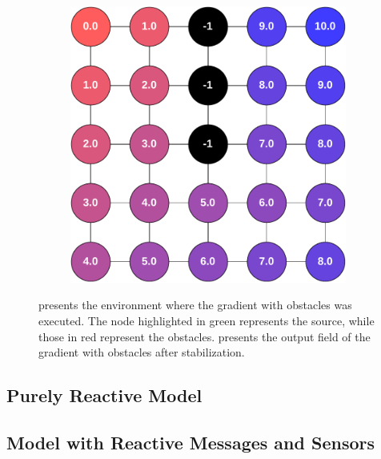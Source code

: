 \begin{figure}
\begin{subfigure}[b]{.49\textwidth}
        \caption{}
        \label{fig:gradient-envronment}
    \end{subfigure}
    \hfill
    \begin{subfigure}[b]{.49\textwidth}
        \centering
        \includegraphics[width=\textwidth]{figures/gradient-environment-execution.pdf}
        \caption{}
        \label{fig:gradient-envronment-execution}
    \end{subfigure}
    \caption{ presents the environment where the gradient with obstacles was executed. The node highlighted in green represents the source, while those in red represent the obstacles.  presents the output field of the gradient with obstacles after stabilization.}
\end{figure}



\subsection{Purely Reactive Model}



\subsection{Model with Reactive Messages and Sensors}


